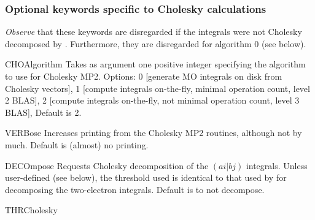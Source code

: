 \subsubsection{Optional keywords specific to Cholesky calculations}
{\em Observe} that these keywords are disregarded if the integrals
were not Cholesky decomposed by . Furthermore, they
are disregarded for algorithm 0 (see below).
\begin{keywordlist}
\item[CHOAlgorithm]
Takes as argument one positive integer specifying
the algorithm to use for Cholesky MP2.
Options: 0 [generate MO integrals on disk from Cholesky vectors],
1 [compute integrals on-the-fly, minimal operation count, level 2 BLAS],
2 [compute integrals on-the-fly, not minimal operation count, level 3 BLAS],
Default is 2.
\item[VERBose]
Increases printing from the Cholesky MP2 routines, although not
by much.
Default is (almost) no printing.
\item[DECOmpose]
Requests Cholesky decomposition of the $(ai|bj)$ integrals.
Unless user-defined (see below), the threshold used is identical
to that used by  for decomposing the two-electron
integrals. Default is to not decompose.
\item[THRCholesky]

\end{keywordlist}

